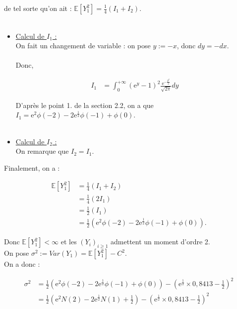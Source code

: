 \documentclass{article}
\theoremstyle{exostyle}
\newenvironment{questions}{
\begin{enumerate}[\hspace{12pt} 1.]}{\end{enumerate}}
\begin{document}
\begin{questions}
de tel sorte qu'on ait : $\mathbb{E}\left[ Y_{1}^{2} \right] = \frac{1}{4} \left( I_{1}+I_{2} \right)$.\\
\\
\begin{itemize}
    \item \underline{Calcul de $I_{1}$ :}\\
    
    On fait un changement de variable : on pose $y:=-x$, donc $dy=-dx$.\\
    \\
Donc, 

\begin{align*}
    I_{1} &= \int_{0}^{+\infty} \left(\text{e}^{y}-1\right)^{2} \frac{\text{e}^{-\frac{y^{2}}{2}}}{\sqrt{2\pi}}dy
\end{align*}

D'après le point 1. de la section 2.2, on a que $I_{1} = \text{e}^{2}\phi(-2) -2\text{e}^{\frac{1}{2}}\phi(-1) + \phi(0)$.\\
\\

\item \underline{Calcul de $I_{2}$ :}\\

On remarque que $I_{2} = I_{1}$.
\end{itemize}

\bigbreak

Finalement, on a : 

\begin{align*}
    \mathbb{E}\left[ Y_{1}^{2} \right] &= \frac{1}{4} \left( I_{1} + I_{2} \right)\\
    &= \frac{1}{4} \left( 2I_{1} \right)\\
    &= \frac{1}{2} \left( I_{1} \right)\\
    &= \frac{1}{2} \left( \text{e}^{2} \phi(-2) -2\text{e}^{\frac{1}{2}} \phi(-1) + \phi(0) \right).
\end{align*}

Donc $\mathbb{E}\left[ Y_{1}^{2} \right] < \infty$ et les $(Y_{i})_{i \geq 1}$ admettent un moment d'ordre 2.\\

On pose $\sigma^{2} := Var(Y_{1}) = \mathbb{E}\left[ Y_{1}^{2} \right] - C^{2}$.\\
On a donc :

\begin{align*}
\sigma^{2} &= \frac{1}{2} \left( \text{e}^{2} \phi(-2) -2\text{e}^{\frac{1}{2}} \phi(-1) + \phi(0) \right) - \left( \text{e}^{\frac{1}{2}} \times 0,8413 - \frac{1}{2} \right)^{2}\\
&= \frac{1}{2} \left( \text{e}^{2} N(2) -2\text{e}^{\frac{1}{2}} N(1) + \frac{1}{2} \right) - \left( \text{e}^{\frac{1}{2}} \times 0,8413 - \frac{1}{2} \right)^{2}
\end{align*}


\end{questions}
\end{document}
